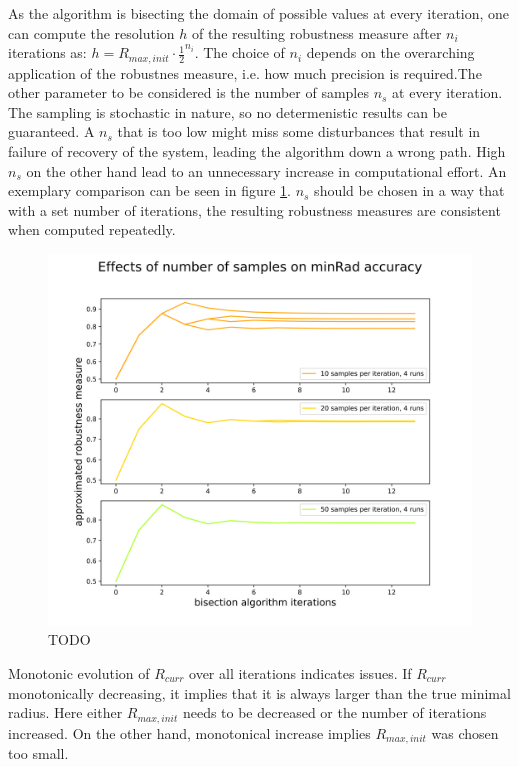     As the algorithm is bisecting the domain of possible values at every iteration, one can compute the resolution $h$ of the resulting robustness measure after $n_i$ iterations as: $h = R_{max,init}\cdot\frac{1}{2}^{n_i}$. The choice of $n_i$ depends on the overarching application of the robustnes measure, i.e. how much precision is required.The other parameter to be considered is the number of samples $n_{s}$ at every iteration. The sampling is stochastic in nature, so no determenistic results can be guaranteed. A $n_{s}$ that is too low might miss some disturbances that result in failure of recovery of the system, leading the algorithm down a wrong path. High $n_{s}$ on the other hand lead to an unnecessary increase in computational effort. An exemplary comparison can be seen in figure \ref{fig:minradcomp}. 
    $n_{s}$ should be chosen in a way that with a set number of iterations, the resulting robustness measures are consistent when computed repeatedly. 

    \begin{figure}[ht] \label{fig:minradcomp}
    
    \includegraphics[width=.9\linewidth]{figures/minRad_tuning_graph.png}
    \caption{TODO}
    \end{figure}

    Monotonic evolution of $R_{curr}$ over all iterations indicates issues. If $R_{curr}$ monotonically decreasing, it implies that it is always larger than the true minimal radius. Here either $R_{max,init}$ needs to be decreased or the number of iterations increased. On the other hand, monotonical increase implies $R_{max,init}$ was chosen too small.

